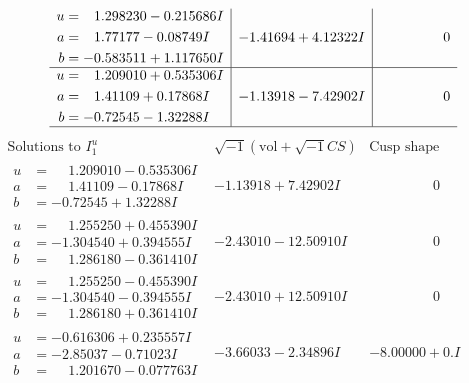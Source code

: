 \documentclass[1p]{elsarticle_modified}
\theoremstyle{definition}
\newcommand{\I}{\sqrt{-1}}
\begin{document}
$$\begin{array}{c|c|c}
\begin{aligned}
u &= \phantom{-}1.298230 - 0.215686 I \\
a &= \phantom{-}1.77177 - 0.08749 I \\
b &= -0.583511 + 1.117650 I\end{aligned}
 & -1.41694 + 4.12322 I & \phantom{-0.000000 } 0 \\ \hline\begin{aligned}
u &= \phantom{-}1.209010 + 0.535306 I \\
a &= \phantom{-}1.41109 + 0.17868 I \\
b &= -0.72545 - 1.32288 I\end{aligned}
 & -1.13918 - 7.42902 I & \phantom{-0.000000 } 0\\
 \hline 
 \end{array}$$\newpage$$\begin{array}{c|c|c}  
\text{Solutions to }I^u_{1}& \I (\text{vol} + \sqrt{-1}CS) & \text{Cusp shape}\\
 \hline 
\begin{aligned}
u &= \phantom{-}1.209010 - 0.535306 I \\
a &= \phantom{-}1.41109 - 0.17868 I \\
b &= -0.72545 + 1.32288 I\end{aligned}
 & -1.13918 + 7.42902 I & \phantom{-0.000000 } 0 \\ \hline\begin{aligned}
u &= \phantom{-}1.255250 + 0.455390 I \\
a &= -1.304540 + 0.394555 I \\
b &= \phantom{-}1.286180 - 0.361410 I\end{aligned}
 & -2.43010 - 12.50910 I & \phantom{-0.000000 } 0 \\ \hline\begin{aligned}
u &= \phantom{-}1.255250 - 0.455390 I \\
a &= -1.304540 - 0.394555 I \\
b &= \phantom{-}1.286180 + 0.361410 I\end{aligned}
 & -2.43010 + 12.50910 I & \phantom{-0.000000 } 0 \\ \hline\begin{aligned}
u &= -0.616306 + 0.235557 I \\
a &= -2.85037 - 0.71023 I \\
b &= \phantom{-}1.201670 - 0.077763 I\end{aligned}
 & -3.66033 - 2.34896 I & -8.00000 + 0. I\phantom{ +0.000000I} \\ \hline\begin{aligned}

\end{aligned}
\end{array}$$
\end{document}
